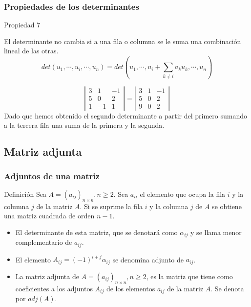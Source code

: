 \documentclass[aspectratio=169]{beamer}
\begin{document}
  
    
     \begin{frame}
  \frametitle{Propiedades de los determinantes}
   \begin{block}{Propiedad 7}
   
El determinante no cambia si a una fila o columna se le suma una combinaci\'on lineal de las otras.
   \[det(u_1, \cdots,u_i, \cdots, u_n) = det(u_1, \cdots,u_i + \sum_{k\neq i} a_k u_k, \cdots, u_n) \]
   
\end{block}

\[ \left|\begin{array}{ccc}3 & 1 & -1 \\5 & 0 & 2 \\1 & -1 & 1\end{array}\right| =  
	\left|\begin{array}{ccc}3 & 1 & -1 \\5 & 0 & 2 \\9 & 0 & 2\end{array}\right| \]
Dado que hemos obtenido el segundo determinante a partir del primero sumando a la tercera fila una suma de la primera y la segunda.
   \end{frame} 
  
        \subsection{Matriz adjunta}
 \begin{frame}
  \frametitle{Adjuntos de una matriz}
   \begin{block}{Definici\'on}
   Sea $A=(a_{ij})_{n\times n}, n\geq 2$. Sea $a_{ii}$ el elemento que ocupa la fila $i$ y la columna $j$ de la matriz $A$. Si se suprime la fila $i$ y la columna $j$ de $A$ se obtiene una matriz cuadrada de orden $n-1$.
   \begin{itemize}
   \item El determinante de esta matriz, que se denotar\'a como $\alpha_{ij}$ y se llama menor complementario de $a_{ij}$.
    \item El elemento $A_{ij} = (-1)^{i+j}\alpha_{ij}$ se denomina adjunto de $a_{ij}$.
    \item La matriz adjunta de $A=(a_{ij})_{n\times n}, n\geq 2$, es la matriz que tiene como coeficientes a los adjuntos $A_{ij}$ de los elementos $a_{ij}$ de la matriz $A$. Se denota por $adj(A)$.
   \end{itemize}
   \end{block}
   \end{frame} 
   
\end{document}
